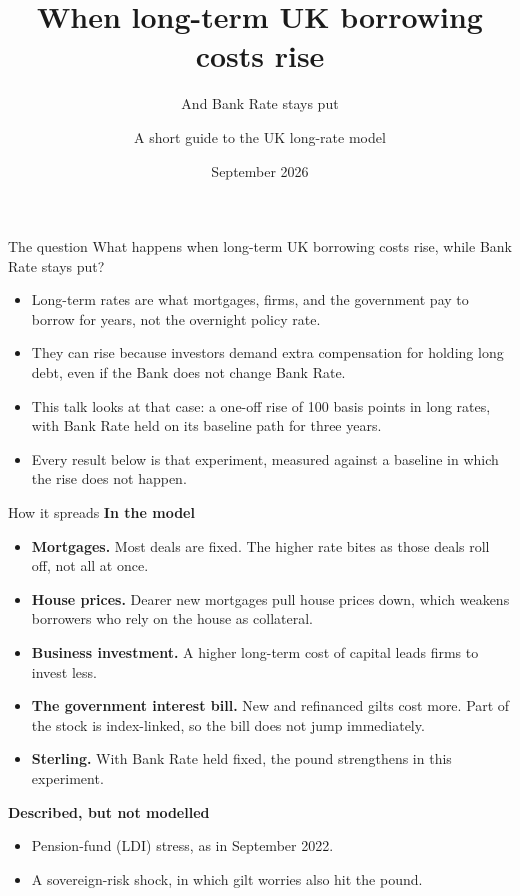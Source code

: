 \documentclass[11pt,aspectratio=169]{beamer}
\title[Long-term UK borrowing costs]{When long-term UK borrowing costs rise}
\subtitle{And Bank Rate stays put}
\author[UK long-rate]{A short guide to the UK long-rate model}
\institute[MacroModellerBot]{\texttt{uk-long-rate/} in MacroModellerBot}
\date{September 2026}
\begin{document}
\begin{frame}[plain]
  \titlepage
\end{frame}

\begin{frame}{The question}
  What happens when long-term UK borrowing costs rise,
  while Bank Rate stays put?
  \vspace{0.6em}
  \begin{itemize}
    \item Long-term rates are what mortgages, firms, and the government
          pay to borrow for years, not the overnight policy rate.
    \item They can rise because investors demand extra compensation
          for holding long debt, even if the Bank does not change
          Bank Rate.
    \item This talk looks at that case: a one-off rise of 100 basis
          points in long rates, with Bank Rate held on its baseline
          path for three years.
    \item Every result below is that experiment, measured against a
          baseline in which the rise does not happen.
  \end{itemize}
\end{frame}

\begin{frame}{How it spreads}
  \textbf{In the model}
  \begin{itemize}
    \item \textbf{Mortgages.} Most deals are fixed. The higher rate
          bites as those deals roll off, not all at once.
    \item \textbf{House prices.} Dearer new mortgages pull house prices
          down, which weakens borrowers who rely on the house as
          collateral.
    \item \textbf{Business investment.} A higher long-term cost of
          capital leads firms to invest less.
    \item \textbf{The government interest bill.} New and refinanced
          gilts cost more. Part of the stock is index-linked, so the
          bill does not jump immediately.
    \item \textbf{Sterling.} With Bank Rate held fixed, the pound
          strengthens in this experiment.
  \end{itemize}
  \vspace{0.35em}
  \textbf{Described, but not modelled}
  \begin{itemize}
    \item Pension-fund (LDI) stress, as in September 2022.
    \item A sovereign-risk shock, in which gilt worries also hit
          the pound.
  \end{itemize}
\end{frame}
\end{document}
